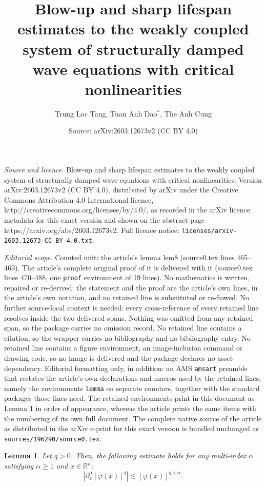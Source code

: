 \documentclass[10pt,a4paper]{amsart}
\title{Blow-up and sharp lifespan estimates to the weakly coupled system of structurally damped wave equations with critical nonlinearities}
\author{Trung Loc Tang, Tuan Anh Dao$^*$, The Anh Cung}
\date{Source: arXiv:2603.12673v2 (CC BY 4.0)}
\newtheorem{lemma}{Lemma}
\begin{document}
\maketitle

\noindent\emph{Source and licence.} Blow-up and sharp lifespan estimates to the weakly coupled system of structurally damped wave equations with critical nonlinearities. Version arXiv:2603.12673v2 (CC BY 4.0), distributed by arXiv under the Creative Commons Attribution 4.0 International licence, http://creativecommons.org/licenses/by/4.0/, as recorded in the arXiv licence metadata for this exact version and shown on the abstract page https://arxiv.org/abs/2603.12673v2. Full licence notice: \texttt{licenses/arxiv-2603.12673-CC-BY-4.0.txt}.\par\smallskip

\noindent\textit{Editorial scope.} Counted unit: the article's lemma lem8 (source0.tex lines 465--469). The article's complete original proof of it is delivered with it (source0.tex lines 470--488, one \texttt{proof} environment of 19 lines). No mathematics is written, repaired or re-derived: the statement and the proof are the article's own lines, in the article's own notation, and no retained line is substituted or re-flowed.  No further source-local context is needed: every cross-reference of every retained line resolves inside the two delivered spans.  Nothing was omitted from any retained span, so the package carries no omission record.  No retained line contains a citation, so the wrapper carries no bibliography and no bibliography entry.  No retained line contains a figure environment, an image-inclusion command or drawing code, so no image is delivered and the package declares no asset dependency.  Editorial formatting only, in addition: an AMS \texttt{amsart} preamble that restates the article's own declarations and macros used by the retained lines, namely the environments \texttt{lemma} on separate counters, together with the standard packages those lines need.  The retained environments print in this document as Lemma 1 in order of appearance, whereas the article prints the same items with the numbering of its own full document.  The complete native source of the article as distributed in the arXiv e-print for this exact version is bundled unchanged as \texttt{sources/196290/source0.tex}.
\begin{lemma}\label{lem8} Let $q>0$. Then, the following estimate holds for any multi-index $\alpha$ satisfying $\alpha \geq 1$ and $x \in \mathbb{R}^n$:
$$
\left|\partial_x^\alpha [\varphi(x)]^{q}\right| \lesssim[\varphi(x)]^{q+\alpha}.
$$
\end{lemma}
\end{document}

